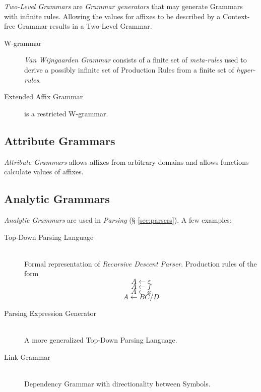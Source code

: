 \documentclass{article}
\begin{document}
\emph{Two-Level Grammars} are \emph{Grammar generators} that may
generate Grammars with infinite rules. Allowing the values for affixes
to be described by a Context-free Grammar results in a Two-Level
Grammar.


\begin{description}
\item[W-grammar] \emph{Van Wijngaarden Grammar} consists of a finite
  set of \emph{meta-rules} used to derive a possibly infinite set of
  Production Rules from a finite set of \emph{hyper-rules}.
\item[Extended Affix Grammar] is a restricted W-grammar.
\end{description}

\subsection{Attribute Grammars}

\emph{Attribute Grammars} allows affixes from arbitrary domains and
allows functions calculate values of affixes.

\subsection{Analytic Grammars}

\emph{Analytic Grammars} are used in \emph{Parsing} (\S
\ref{sec:parsers}). A few examples:

\begin{description}
\item[Top-Down Parsing Language] \hfill \\
Formal representation of \emph{Recursive Descent Parser}. Production
rules of the form
\[
    A \leftarrow \varepsilon
\]\[
    A \leftarrow f
\]\[
    A \leftarrow a
\]\[
    A \leftarrow BC/D
\]
\item[Parsing Expression Generator] \hfill \\
A more generalized Top-Down Parsing Language.
\item[Link Grammar] \hfill \\
Dependency Grammar with directionality between Symbols.
\end{description}
\end{document}
